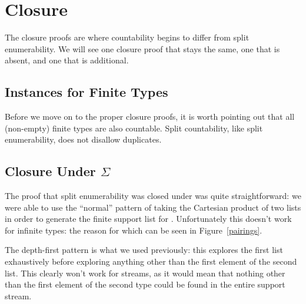 \section{Closure}
The closure proofs are where countability begins to differ from split
enumerability.
We will see one closure proof that stays the same, one that is absent, and one
that is additional.
\subsection{Instances for Finite Types}
Before we move on to the proper closure proofs, it is worth pointing out that
all (non-empty) finite types are also countable.
Split countability, like split enumerability, does not disallow duplicates.
\subsection{Closure Under \(\Sigma\)}
The proof that split enumerability was closed under \AgdaDatatype{\(\Sigma\)}
was quite straightforward:
we were able to use the ``normal'' pattern of taking the Cartesian product of
two lists in order to generate the finite support list for
\AgdaDatatype{\(\Sigma\)}.
Unfortunately this doesn't work for infinite types: the reason for which can be
seen in Figure~\ref{pairings}.




The depth-first pattern is what we used previously: this explores the first list
exhaustively before exploring anything other than the first element of the
second list.
This clearly won't work for streams, as it would mean that nothing other than
the first element of the second type could be found in the entire support
stream.

